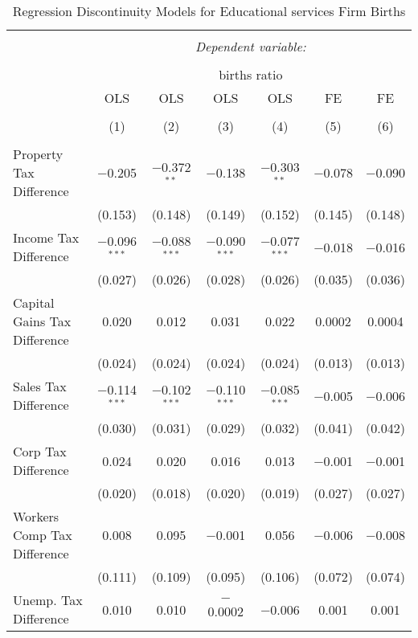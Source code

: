 
\begin{table}[!htbp] \centering 
  \caption{Regression Discontinuity Models for  Educational services Firm Births} 
  \label{61rd} 
\footnotesize 
\begin{tabular}{@{\extracolsep{5pt}}lcccccc} 
\\[-1.8ex]\hline 
\hline \\[-1.8ex] 
 & \multicolumn{6}{c}{\textit{Dependent variable:}} \\ 
\cline{2-7} 
\\[-1.8ex] & \multicolumn{6}{c}{births ratio} \\ 
 & OLS & OLS & OLS & OLS & FE & FE \\ 
\\[-1.8ex] & (1) & (2) & (3) & (4) & (5) & (6)\\ 
\hline \\[-1.8ex] 
 Property Tax Difference & $-$0.205 & $-$0.372$^{**}$ & $-$0.138 & $-$0.303$^{**}$ & $-$0.078 & $-$0.090 \\ 
  & (0.153) & (0.148) & (0.149) & (0.152) & (0.145) & (0.148) \\ 
  Income Tax Difference & $-$0.096$^{***}$ & $-$0.088$^{***}$ & $-$0.090$^{***}$ & $-$0.077$^{***}$ & $-$0.018 & $-$0.016 \\ 
  & (0.027) & (0.026) & (0.028) & (0.026) & (0.035) & (0.036) \\ 
  Capital Gains Tax Difference & 0.020 & 0.012 & 0.031 & 0.022 & 0.0002 & 0.0004 \\ 
  & (0.024) & (0.024) & (0.024) & (0.024) & (0.013) & (0.013) \\ 
  Sales Tax Difference & $-$0.114$^{***}$ & $-$0.102$^{***}$ & $-$0.110$^{***}$ & $-$0.085$^{***}$ & $-$0.005 & $-$0.006 \\ 
  & (0.030) & (0.031) & (0.029) & (0.032) & (0.041) & (0.042) \\ 
  Corp Tax Difference & 0.024 & 0.020 & 0.016 & 0.013 & $-$0.001 & $-$0.001 \\ 
  & (0.020) & (0.018) & (0.020) & (0.019) & (0.027) & (0.027) \\ 
  Workers Comp Tax Difference & 0.008 & 0.095 & $-$0.001 & 0.056 & $-$0.006 & $-$0.008 \\ 
  & (0.111) & (0.109) & (0.095) & (0.106) & (0.072) & (0.074) \\ 
  Unemp. Tax Difference & 0.010 & 0.010 & $-$0.0002 & $-$0.006 & 0.001 & 0.001 \\ 

\end{tabular}
\end{table}
